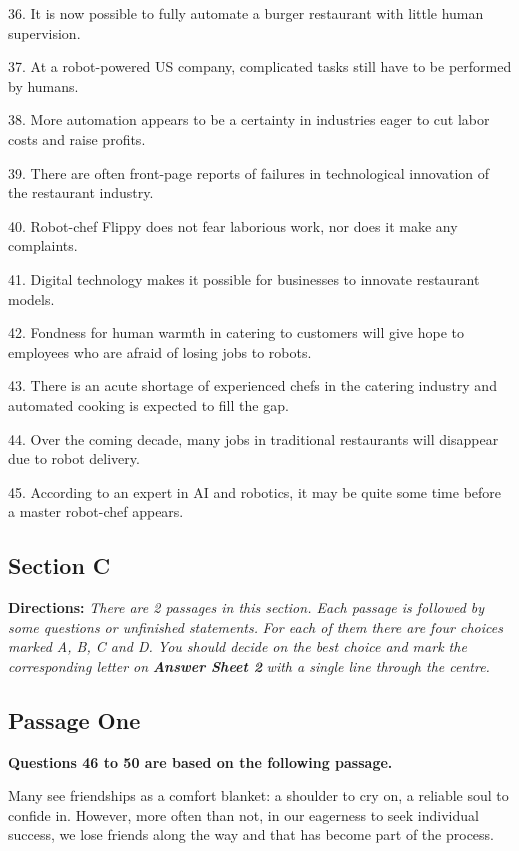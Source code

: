\documentclass[UTF8,11pt]{ctexart}
\begin{document}
36. It is now possible to fully automate a burger restaurant with little human supervision.


37. At a robot-powered US company, complicated tasks still have to be performed by humans.


38. More automation appears to be a certainty in industries eager to cut labor costs and raise profits.


39. There are often front-page reports of failures in technological innovation of the restaurant industry.


40. Robot-chef Flippy does not fear laborious work, nor does it make any complaints.


41. Digital technology makes it possible for businesses to innovate restaurant models.


42. Fondness for human warmth in catering to customers will give hope to employees who are afraid of losing jobs to robots.


43. There is an acute shortage of experienced chefs in the catering industry and automated cooking is expected to fill the gap.


44. Over the coming decade, many jobs in traditional restaurants will disappear due to robot delivery.


45. According to an expert in AI and robotics, it may be quite some time before a master robot-chef appears.


\subsection*{\textbf{Section C}}


\textbf{Directions: }\textit{There are 2 passages in this section. Each passage is followed by some questions or unfinished statements.} \textit{For each of them there are four choices marked A, B, C and D. You should decide on the best choice and mark the} \textit{corresponding letter on }\textbf{\textit{Answer Sheet 2}}\textit{ with a single line through the centre.}


\subsection*{\textbf{Passage One}}


\textbf{Questions 46 to 50 are based on the following passage.}


Many see friendships as a comfort blanket: a shoulder to cry on, a reliable soul to confide in. However, more often than not, in our eagerness to seek individual success, we lose friends along the way and that has become part of the process.
\end{document}
